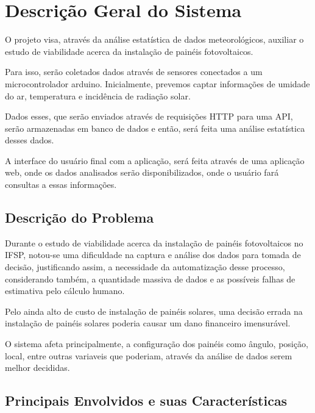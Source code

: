 \chapter{Descrição Geral do Sistema}


O projeto visa, através da análise estatística de dados meteorológicos, auxiliar o estudo de viabilidade acerca da instalação de painéis fotovoltaicos.

Para isso, serão coletados dados através de sensores conectados a um microcontrolador arduino. Inicialmente, prevemos captar informações de umidade do ar, temperatura e incidência de radiação solar.

Dados esses, que serão enviados através de requisições HTTP para uma API, serão armazenadas em banco de dados e então, será feita uma análise estatística desses dados.

A interface do usuário final com a aplicação, será feita através de uma aplicação web, onde os dados analisados serão disponibilizados, onde o usuário fará consultas a essas informações.

\section{Descrição do Problema}

Durante o estudo de viabilidade acerca da instalação de painéis fotovoltaicos no IFSP, notou-se uma dificuldade na captura e análise dos dados para tomada de decisão, justificando assim, a necessidade da automatização desse processo, considerando também, a quantidade massiva de dados e as possíveis falhas de estimativa pelo cálculo humano.

Pelo ainda alto de custo de instalação de painéis solares, uma decisão errada na instalação de painéis solares poderia causar um dano financeiro imensurável.

O sistema afeta principalmente, a configuração dos painéis como ângulo, posição, local, entre outras variaveis que poderiam, através da análise de dados serem melhor decididas.

\section{Principais Envolvidos e suas Características}

